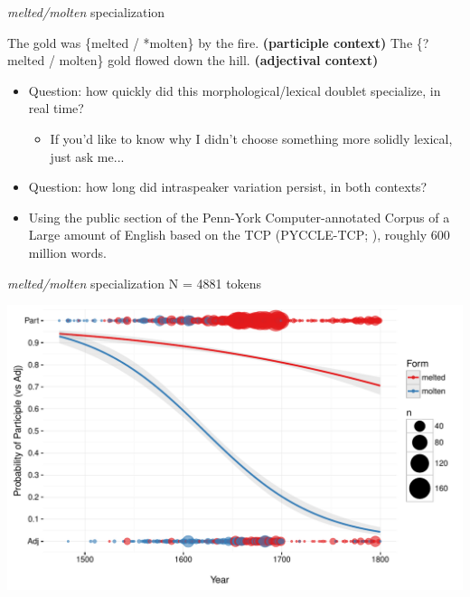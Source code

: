 \documentclass[hyperref={pdfpagelabels=false}]{beamer}
\begin{document}
\begin{frame}{\textsl{melted/molten} specialization}
\begin{exe}
	\ex The gold was \{melted / *molten\} by the fire. \textbf{(participle context)}
	\ex The \{?melted / molten\} gold flowed down the hill. \textbf{(adjectival context)}
\end{exe}
\begin{itemize}
\item Question: how quickly did this morphological/lexical doublet specialize, in real time?
\begin{itemize}
	\item If you'd like to know why I didn't choose something more solidly lexical, just ask me...
\end{itemize}
\item Question: how long did intraspeaker variation persist, in both contexts?
\item Using the public section of the {P}enn-{Y}ork {C}omputer-annotated {C}orpus of a {L}arge amount of {E}nglish based on the {TCP (PYCCLE-TCP; \citealt{pyccle})}, roughly 600 million words.
\end{itemize}
\end{frame}


\begin{frame}{\textsl{melted/molten} specialization N =  4881 tokens}

\includegraphics[width=1.128\textwidth]{ContextByDateUnbinnedWithDots2.pdf}
\end{frame}
\end{document}
